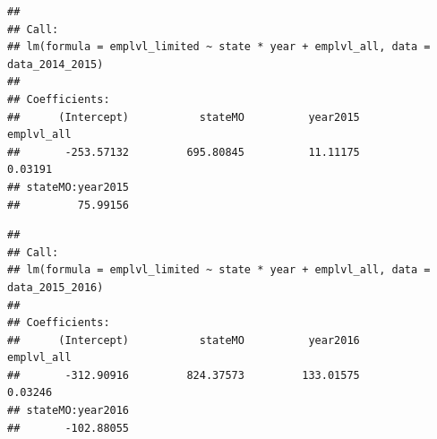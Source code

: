 \documentclass[
]{article}
\newenvironment{Shaded}{\begin{snugshade}}{\end{snugshade}}
\newcommand{\AttributeTok}[1]{\textcolor[rgb]{0.13,0.29,0.53}{#1}}
\newcommand{\CommentTok}[1]{\textcolor[rgb]{0.56,0.35,0.01}{\textit{#1}}}
\newcommand{\DecValTok}[1]{\textcolor[rgb]{0.00,0.00,0.81}{#1}}
\newcommand{\FloatTok}[1]{\textcolor[rgb]{0.00,0.00,0.81}{#1}}
\newcommand{\FunctionTok}[1]{\textcolor[rgb]{0.13,0.29,0.53}{\textbf{#1}}}
\newcommand{\NormalTok}[1]{#1}
\newcommand{\OtherTok}[1]{\textcolor[rgb]{0.56,0.35,0.01}{#1}}
\newcommand{\SpecialCharTok}[1]{\textcolor[rgb]{0.81,0.36,0.00}{\textbf{#1}}}
\begin{document}
\begin{verbatim}
## 
## Call:
## lm(formula = emplvl_limited ~ state * year + emplvl_all, data = data_2014_2015)
## 
## Coefficients:
##      (Intercept)           stateMO          year2015        emplvl_all  
##       -253.57132         695.80845          11.11175           0.03191  
## stateMO:year2015  
##         75.99156
\end{verbatim}

\begin{Shaded}
\end{Shaded}

\begin{verbatim}
## 
## Call:
## lm(formula = emplvl_limited ~ state * year + emplvl_all, data = data_2015_2016)
## 
## Coefficients:
##      (Intercept)           stateMO          year2016        emplvl_all  
##       -312.90916         824.37573         133.01575           0.03246  
## stateMO:year2016  
##       -102.88055
\end{verbatim}
\end{document}
